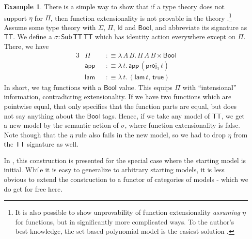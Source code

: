 \documentclass[12pt,a4paper,twoside,openany]{book}
\theoremstyle{remark}
\theoremstyle{definition}
\newtheorem{myexample}{Example}
\theoremstyle{theorem}
\newcommand{\ms}[1]{\mathsf{#1}}
\newcommand{\Sub}{\mathsf{Sub}}
\newcommand{\Id}{\mathsf{Id}}
\newcommand{\proj}{\mathsf{proj}}
\newcommand{\app}{\ms{app}}
\newcommand{\Bool}{\ms{Bool}}
\newcommand{\lam}{\ms{lam}}
\newcommand{\true}{\ms{true}}
\newcommand{\defn}{:\equiv}
\begin{document}
\begin{myexample}
There is a simple way to show that if a type theory does not support $\eta$ for
$\Pi$, then function extensionality is not provable in the theory
\cite{next700}.\footnote{It is also possible to show unprovability of function
extensionality \emph{assuming} $\eta$ for functions, but in significantly more
complicated ways. To the author's best knowledge, the set-based polynomial model
is the easiest solution \cite{von2015polynomials}.} Assume some type theory with $\Sigma$,
$\Pi$, $\Id$ and $\Bool$, and abbreviate its signature as $\ms{TT}$. We define a
$\sigma : \Sub\,\ms{TT}\,\ms{TT}$ which has identity action everywhere except on
$\Pi$. There, we have
\begin{alignat*}{3}
  &\Pi    &&\defn \lambda\,A\,B.\,\Pi\,A\,B \times \Bool \\
  &\app   &&\defn \lambda\,t.\,\app\,(\proj_1\,t)\\
  &\lam   &&\defn \lambda\,t.\,(\lam\,t,\,\true)
\end{alignat*}
In short, we tag functions with a $\Bool$ value. This equips $\Pi$ with
``intensional'' information, contradicting extensionality. If we have two
functions which are pointwise equal, that only specifies that the function parts
are equal, but does not say anything about the $\Bool$ tags. Hence, if we take
any model of $\ms{TT}$, we get a new model by the semantic action of $\sigma$,
where function extensionality is false. Note though that the $\eta$ rule also
fails in the new model, so we had to drop $\eta$ from the $\ms{TT}$ signature
as well.

In \cite{next700}, this construction is presented for the special case where the
starting model is initial. While it is easy to generalize to arbitrary starting
models, it is less obvious to extend the construction to a functor of categories
of models - which we do get for free here.
\end{myexample}
\end{document}
